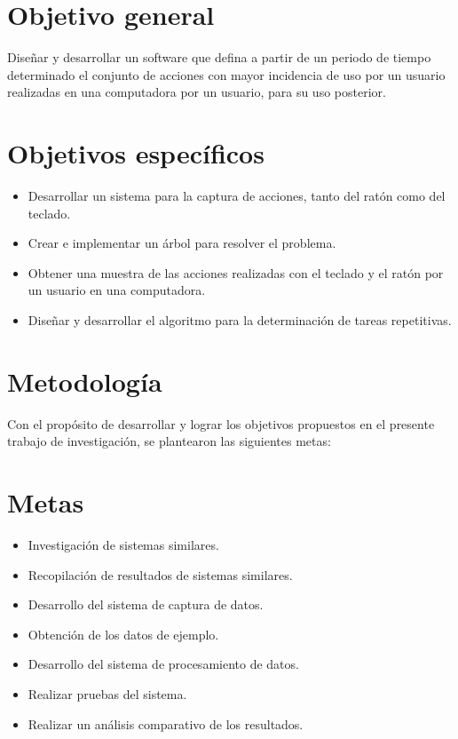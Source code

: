 \section{Objetivo general} 
Dise\~nar y desarrollar un software que defina a partir de un periodo de
 tiempo determinado el conjunto de acciones con mayor incidencia de uso por 
 un usuario realizadas en una computadora por un usuario, para su uso 
 posterior.

\section{Objetivos espec\'ificos}
\begin{itemize}
  \item Desarrollar un sistema para la captura de acciones, tanto del rat\'on
  como del teclado.
  \item Crear e implementar un \'arbol para resolver el problema.
  \item Obtener una muestra de las acciones realizadas con el teclado y el 
  rat\'on por un usuario en una computadora.
  \item Dise\~nar y desarrollar el algoritmo para la determinaci\'on de
  tareas repetitivas.
\end{itemize}


\section{Metodolog\'ia}
Con el prop\'osito de desarrollar y lograr los objetivos propuestos en el
 presente trabajo de investigaci\'on, se plantearon las siguientes metas:
\section*{Metas}
\begin{itemize}
  \item Investigaci\'on de sistemas similares.
  \item Recopilaci\'on de resultados de sistemas similares.
  \item Desarrollo del sistema  de captura de datos.
  \item Obtenci\'on de los datos de ejemplo.
  \item Desarrollo del sistema de procesamiento de datos.
  \item Realizar pruebas del sistema.
  \item Realizar un an\'alisis comparativo de los resultados.
\end{itemize}